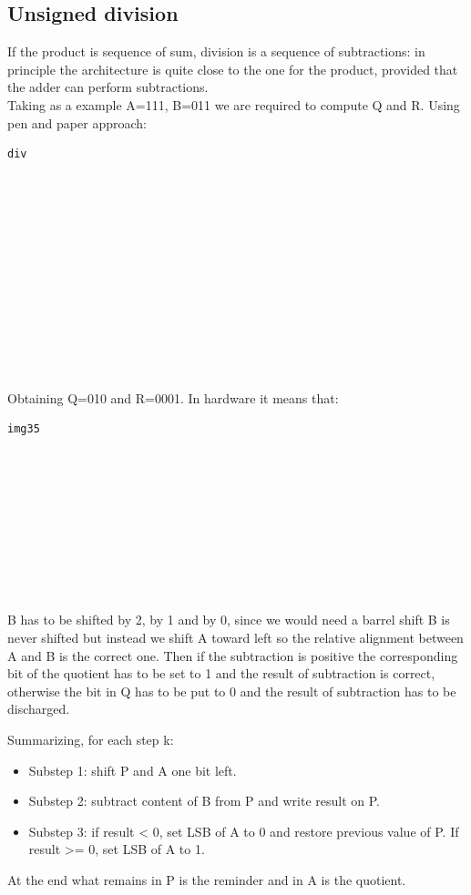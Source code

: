 \subsection{Unsigned division}
If the product is sequence of sum, division is a sequence of subtractions: in principle the architecture is quite close to the one for the product, provided that the adder can perform subtractions.\\

Taking as a example A=111, B=011 we are required to compute Q and R. Using pen and paper approach:

\begin{verbatim}
div













\end{verbatim}

Obtaining Q=010 and R=0001. In hardware it means that:
\begin{verbatim}
img35










\end{verbatim}
B has to be shifted by 2, by 1 and by 0, since we would need a barrel shift B is never shifted but instead we shift A toward left so the relative alignment between A and B is the correct one. Then if the subtraction is positive the corresponding bit of the quotient has to be set to 1 and the result of subtraction is correct, otherwise the bit in Q has to be put to 0 and the result of subtraction has to be discharged.

Summarizing, for each step k:

\begin{itemize}
  \item Substep 1: shift P and A one bit left.
  \item Substep 2: subtract content of B from P and write result on P.
  \item Substep 3: if result < 0, set LSB of A to 0 and restore previous value of P.
  If result >= 0, set LSB of A to 1.
\end{itemize}

At the end what remains in P is the reminder and in A is the quotient.

